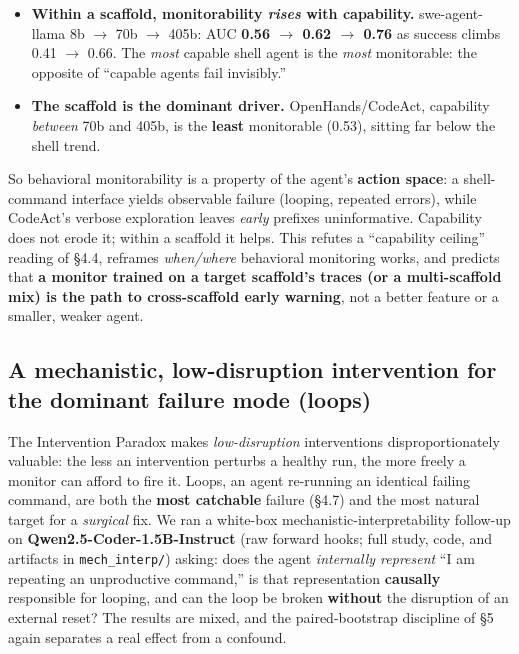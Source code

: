 \begin{itemize}
\item \textbf{Within a scaffold, monitorability \emph{rises} with capability.} swe-agent-llama 8b $\to$ 70b $\to$ 405b: AUC \textbf{0.56 $\to$ 0.62 $\to$ 0.76} as success climbs 0.41 $\to$ 0.66. The \emph{most} capable shell agent is the \emph{most} monitorable: the opposite of ``capable agents fail invisibly.''
\item \textbf{The scaffold is the dominant driver.} OpenHands/CodeAct, capability \emph{between} 70b and 405b, is the \textbf{least} monitorable (0.53), sitting far below the shell trend.
\end{itemize}
So behavioral monitorability is a property of the agent's \textbf{action space}: a shell-command interface yields observable failure (looping, repeated errors), while CodeAct's verbose exploration leaves \emph{early} prefixes uninformative. Capability does not erode it; within a scaffold it helps. This refutes a ``capability ceiling'' reading of \S4.4, reframes \emph{when/where} behavioral monitoring works, and predicts that \textbf{a monitor trained on a target scaffold's traces (or a multi-scaffold mix) is the path to cross-scaffold early warning}, not a better feature or a smaller, weaker agent.

\subsection{A mechanistic, low-disruption intervention for the dominant failure mode (loops)}
The Intervention Paradox makes \emph{low-disruption} interventions disproportionately valuable: the less an intervention perturbs a healthy run, the more freely a monitor can afford to fire it. Loops, an agent re-running an identical failing command, are both the \textbf{most catchable} failure (\S4.7) and the most natural target for a \emph{surgical} fix. We ran a white-box mechanistic-interpretability follow-up on \textbf{Qwen2.5-Coder-1.5B-Instruct} (raw forward hooks; full study, code, and artifacts in \texttt{mech\_interp/}) asking: does the agent \emph{internally represent} ``I am repeating an unproductive command,'' is that representation \textbf{causally} responsible for looping, and can the loop be broken \textbf{without} the disruption of an external reset? The results are mixed, and the paired-bootstrap discipline of \S5 again separates a real effect from a confound.

